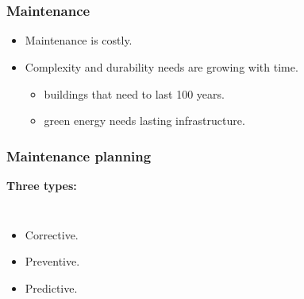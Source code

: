 \section{\introtitle}

\begin{frame}
\frametitle{\textbf{Maintenance}}

  \begin{itemize}[<+->]
    \item Maintenance is costly.
    \item Complexity and durability needs are growing with time.
    \begin{itemize}[<+->]
      \item buildings that need to last 100 years.
      \item green energy needs lasting infrastructure.
    \end{itemize}
  \end{itemize}

\end{frame}

\begin{frame}
\frametitle{\textbf{Maintenance planning}}

\begin{block}{\textbf{Three types:}}
  \begin{columns}[c]
    
    \begin{itemize}[<+->]
      \item Corrective.
      \item \alert<4->{Preventive}.
      \item Predictive.
    \end{itemize} 


  \end{columns}
\end{block}


\end{frame}

